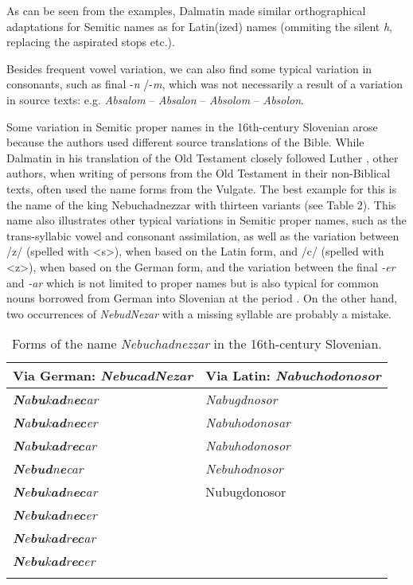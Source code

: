 \documentclass[output=paper,colorlinks,citecolor=brown,arabicfont,chinesefont]{langscibook}
\begin{document}
As can be seen from the examples, Dalmatin made similar orthographical adaptations for Semitic names as for Latin(ized) names (ommiting the silent \emph{h}, replacing the aspirated stops etc.). 

Besides frequent vowel variation, we can also find some typical variation in consonants, such as final -\emph{n} /-\emph{m}, which was not necessarily a result of a variation in source texts: e.g. \emph{Absalom} – \emph{Absalon} – \emph{Absolom} – \emph{Absolon}. 

Some variation in Semitic proper names in the 16th-century Slovenian arose because the authors used different source translations of the Bible. While Dalmatin in his translation of the Old Testament closely followed Luther \citep[3]{Krasovec2010}, other authors, when writing of persons from the Old Testament in their non-Biblical texts, often used the name forms from the Vulgate. The best example for this is the name of the king Nebuchadnezzar with thirteen variants (see Table 2). This name also illustrates other typical variations in Semitic proper names, such as the trans-syllabic vowel and consonant assimilation, as well as the variation between /z/ (spelled with <s>), when based on the Latin form, and /c/ (spelled with <z>), when based on the German form, and the variation between the final \emph{-er} and \emph{-ar} which is not limited to proper names but is also typical for common nouns borrowed from German into Slovenian at the period \citep[141]{Legan_ravnikar2012}. On the other hand, two occurrences of \emph{NebudNezar} with a missing syllable are probably a mistake.

\begin{table}
\caption {Forms of the name \textit{Nebuchadnezzar} in the 16th-century Slovenian.}
\label{tab:jelovsek:frequencies2}
\begin{tabular}{ll}
\lsptoprule
{Via German: \emph{NebucadNezar}} & {Via Latin: \emph{Nabuchodonosor}} \\
\midrule
\emph{\textbf{N}a\textbf{bu}k\textbf{ad}n\textbf{ec}ar} & \emph{Nabugdnosor} \\
\emph{\textbf{N}a\textbf{bu}k\textbf{ad}n\textbf{ec}er} & \emph{Nabuhodonosar} \\
\emph{\textbf{N}a\textbf{bu}k\textbf{ad}r\textbf{ec}ar} & \emph{Nabuhodonosor} \\
\emph{\textbf{N}e\textbf{bud}n\textbf{e}car}            & \emph{Nebuhodnosor} \\
\emph{\textbf{N}e\textbf{bu}k\textbf{ad}n\textbf{ec}ar} & Nubugdonosor \\
\emph{\textbf{N}e\textbf{bu}k\textbf{ad}n\textbf{ec}er} &  \\
\emph{\textbf{N}e\textbf{bu}k\textbf{ad}r\textbf{ec}ar} &  \\
\emph{\textbf{N}e\textbf{bu}k\textbf{ad}r\textbf{ec}er} &  \\
\lspbottomrule
\end{tabular}
\end{table}
\end{document}
